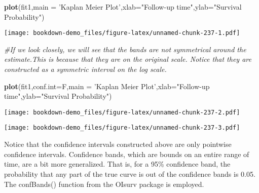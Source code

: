 \documentclass[]{book}
\newenvironment{Shaded}{\begin{snugshade}}{\end{snugshade}}
\newcommand{\KeywordTok}[1]{\textcolor[rgb]{0.13,0.29,0.53}{\textbf{#1}}}
\newcommand{\DataTypeTok}[1]{\textcolor[rgb]{0.13,0.29,0.53}{#1}}
\newcommand{\DecValTok}[1]{\textcolor[rgb]{0.00,0.00,0.81}{#1}}
\newcommand{\FloatTok}[1]{\textcolor[rgb]{0.00,0.00,0.81}{#1}}
\newcommand{\StringTok}[1]{\textcolor[rgb]{0.31,0.60,0.02}{#1}}
\newcommand{\CommentTok}[1]{\textcolor[rgb]{0.56,0.35,0.01}{\textit{#1}}}
\newcommand{\OperatorTok}[1]{\textcolor[rgb]{0.81,0.36,0.00}{\textbf{#1}}}
\newcommand{\NormalTok}[1]{#1}
\theoremstyle{definition}
\theoremstyle{definition}
\theoremstyle{definition}
\theoremstyle{remark}
\begin{document}
\begin{Shaded}
\begin{Highlighting}[]
\KeywordTok{plot}\NormalTok{(fit1,}\DataTypeTok{main =} \StringTok{'Kaplan Meier Plot'}\NormalTok{,}\DataTypeTok{xlab=}\StringTok{"Follow-up time"}\NormalTok{,}\DataTypeTok{ylab=}\StringTok{"Survival Probability"}\NormalTok{)}
\end{Highlighting}
\end{Shaded}

\texttt{[image: bookdown-demo\_files/figure-latex/unnamed-chunk-237-1.pdf]}

\begin{Shaded}
\begin{Highlighting}[]
\CommentTok{#If we look closely, we will see that the bands are not symmetrical around the estimate.This is because that they are on the original scale. Notice that they are constructed as a symmetric interval on the log scale. }

\KeywordTok{plot}\NormalTok{(fit1,}\DataTypeTok{conf.int=}\NormalTok{F,}\DataTypeTok{main =} \StringTok{'Kaplan Meier Plot'}\NormalTok{,}\DataTypeTok{xlab=}\StringTok{"Follow-up time"}\NormalTok{,}\DataTypeTok{ylab=}\StringTok{"Survival Probability"}\NormalTok{)}
\end{Highlighting}
\end{Shaded}

\texttt{[image: bookdown-demo\_files/figure-latex/unnamed-chunk-237-2.pdf]}

\begin{Shaded}
\end{Shaded}

\texttt{[image: bookdown-demo\_files/figure-latex/unnamed-chunk-237-3.pdf]}

Notice that the confidence intervals constructed above are only
pointwise confidence intervals. Confidence bands, which are bounds on an
entire range of time, are a bit more generalized. That is, for a 95\%
confidence band, the probability that any part of the true curve is out
of the confidence bands is 0.05. The confBands() function from the
OIsurv package is employed.
\end{document}
